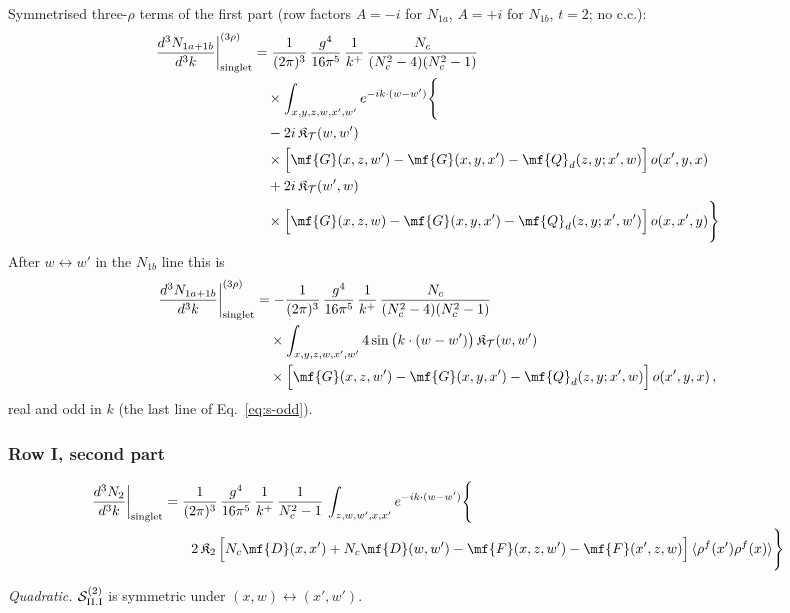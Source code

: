 { Symmetrised three-$\rho$ terms of the first part (row factors $A=-i$ for $N_{1a}$, $A=+i$ for $N_{1b}$, $t=2$; no c.c.):
\begin{align}
\frac{d^{3}N_{1a+1b}}{d^{3}k}\bigg|^{(3\rho)}_{\rm singlet}&=\frac{1}{(2\pi)^{3}}\,\frac{g^{4}}{16\pi^{5}}\,\frac{1}{k^{+}}\,\frac{N_{c}}{(N_{c}^{2}-4)(N_{c}^{2}-1)}\notag\\
&\quad\times\int_{x,y,z,w,x',w'}e^{-ik\cdot(w-w')}\Bigg\{\notag\\
&\quad-2i\,\mathfrak{K}_{\mathcal{T}}(w,w')\notag\\
&\quad\times\Big[\mf{G}(x,z,w')-\mf{G}(x,y,x')-\mf{Q}_{d}(z,y;x',w)\Big]\,o(x',y,x)\notag\\
&\quad+2i\,\mathfrak{K}_{\mathcal{T}}(w',w)\notag\\
&\quad\times\Big[\mf{G}(x,z,w)-\mf{G}(x,y,x')-\mf{Q}_{d}(z,y;x',w')\Big]\,o(x,x',y)\Bigg\}\label{eq:s-o-II-I-1}
\end{align}
After $w\leftrightarrow w'$ in the $N_{1b}$ line this is
\begin{align}
\frac{d^{3}N_{1a+1b}}{d^{3}k}\bigg|^{(3\rho)}_{\rm singlet}&=-\frac{1}{(2\pi)^{3}}\,\frac{g^{4}}{16\pi^{5}}\,\frac{1}{k^{+}}\,\frac{N_{c}}{(N_{c}^{2}-4)(N_{c}^{2}-1)}\notag\\
&\quad\times\int_{x,y,z,w,x',w'}4\sin\big(k\cdot(w-w')\big)\,\mathfrak{K}_{\mathcal{T}}(w,w')\notag\\
&\quad\times\Big[\mf{G}(x,z,w')-\mf{G}(x,y,x')-\mf{Q}_{d}(z,y;x',w)\Big]\,o(x',y,x)\,,\label{eq:s-o-II-I-1sin}
\end{align}
real and odd in $k$ (the last line of Eq.~\eqref{eq:s-odd}).
\subsubsection*{Row I, second part}

\begin{align}
\frac{d^{3}N_{2}}{d^{3}k}\bigg|_{\rm singlet}&=\frac{1}{(2\pi)^{3}}\,\frac{g^{4}}{16\pi^{5}}\,\frac{1}{k^{+}}\,\frac{1}{N_{c}^{2}-1}\,\int_{z,w,w',x,x'}e^{-ik\cdot(w-w')}\Bigg\{\notag\\
&\qquad 2\,\mathfrak{K}_{2}\,\Big[N_{c}\mf{D}(x,x')+N_{c}\mf{D}(w,w')-\mf{F}(x,z,w')-\mf{F}(x',z,w)\Big]\,\langle\rho^{f}(x')\rho^{f}(x)\rangle\Bigg\}\label{eq:s-II-I-2}
\end{align}

\emph{Quadratic.} $\mathcal{S}^{(2)}_{\rm II.I}$ is symmetric under $(x,w)\leftrightarrow(x',w')$.
}
